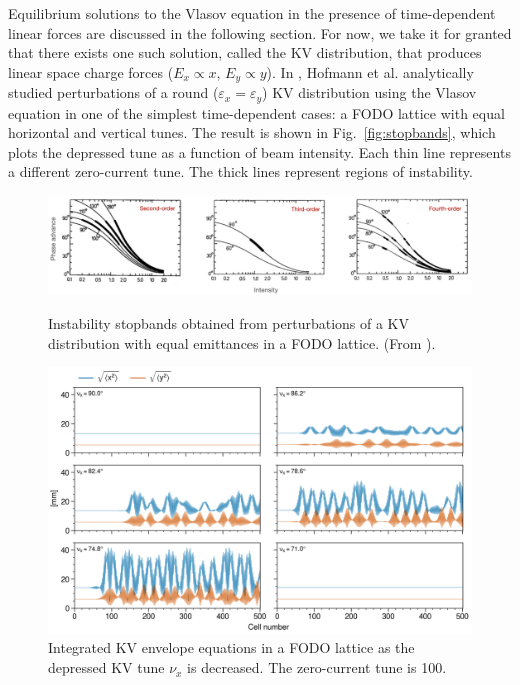 Equilibrium solutions to the Vlasov equation in the presence of time-dependent linear forces are discussed in the following section. For now, we take it for granted that there exists one such solution, called the KV distribution, that produces linear space charge forces ($E_x \propto x$, $E_y \propto y$). In \cite{Hofmann1983}, Hofmann et al. analytically studied perturbations of a round ($\varepsilon_x = \varepsilon_y$) KV distribution using the Vlasov equation in one of the simplest time-dependent cases: a FODO lattice with equal horizontal and vertical tunes. The result is shown in Fig.~\ref{fig:stopbands}, which plots the depressed tune as a function of beam intensity. Each thin line represents a different zero-current tune. The thick lines represent regions of instability.
%
\begin{figure}[p]
    \centering
    \includegraphics[width=\textwidth]{Images/chapter1/stopbands_hor.png}
    \caption{Instability stopbands obtained from perturbations of a KV distribution with equal emittances in a FODO lattice. (From \cite{Hofmann1983}).\label{fig:stopbands}}
    \vfill
    \vspace*{2cm}
    \vfill
    \includegraphics[width=\textwidth]{Images/chapter1/envelope_instability.png}
    \caption{Integrated KV envelope equations in a FODO lattice as the depressed KV tune $\nu_x$ is decreased. The zero-current tune is 100\degree. \label{fig:envelope_instability}}
\end{figure}
%

